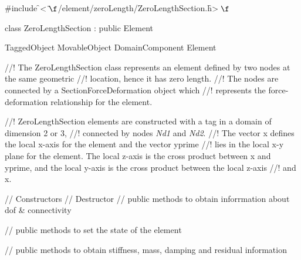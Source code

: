 
\indent \#include \f$<\tilde{ }\f$/element/zeroLength/ZeroLengthSection.h\f$>\f$

\indent class ZeroLengthSection : public Element

\indent TaggedObject
\indent MovableObject
\indent\indent DomainComponent
\indent\indent\indent Element
\indent\indent\indent{}

\indent 
//! The ZeroLengthSection class represents an element defined by two nodes at the same geometric
//! location, hence it has zero length.
//! The nodes are connected by a SectionForceDeformation object which
//! represents the force-deformation relationship for the element. 

//! ZeroLengthSection elements are constructed with a \p tag in a domain of \p dimension 2 or 3,
//! connected by nodes {\em Nd1} and {\em Nd2}. 
//! The vector \p x defines the local x-axis for the element and the vector \p yprime
//! lies in the local x-y plane for the element.  The local z-axis is the cross product between 
\p x and \p yprime, and the local y-axis is the cross product between the local z-axis
//! and \p x.


\indent // Constructors
\indent // Destructor
\indent    // public methods to obtain inforrmation about dof \& connectivity

\indent    // public methods to set the state of the element

\indent    // public methods to obtain stiffness, mass, damping and residual information

